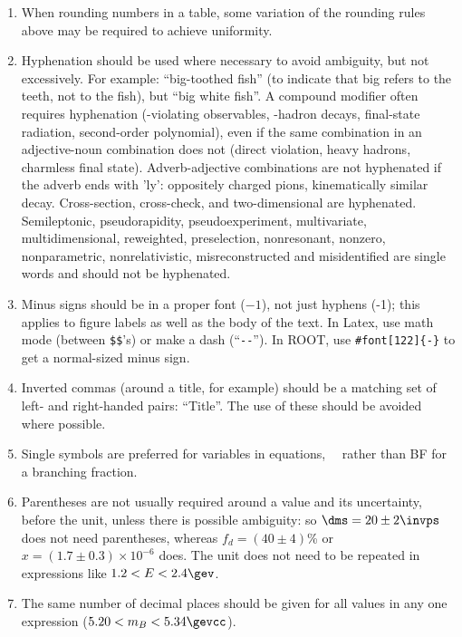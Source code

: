 \begin{enumerate}
\item When rounding numbers in a table, some variation of the rounding
  rules above may be required to achieve uniformity.

\item Hyphenation should be used where necessary to avoid ambiguity,
  but not excessively. For example: ``big-toothed fish''
  (to indicate that big refers to the teeth, not to the fish),
  but ``big white fish''.
  A compound modifier often requires hyphenation 
  (\CP-violating observables, \bquark-hadron decays, final-state radiation, second-order polynomial),
  even if the same combination in an adjective-noun combination does not
  (direct \CP violation, heavy \bquark hadrons, charmless final state).
  Adverb-adjective combinations are not hyphenated if the adverb ends with 'ly':
  oppositely charged pions, kinematically similar decay.
  Cross-section, cross-check, and two-dimensional are hyphenated.
  Semileptonic, pseudorapidity, pseudoexperiment, multivariate, multidimensional, reweighted, preselection, 
  nonresonant, nonzero, nonparametric, nonrelativistic, misreconstructed and misidentified
  are single words and should not be hyphenated.

\item Minus signs should be in a proper font ($-1$), not just hyphens
  (-1); this applies to figure labels as well as the body of the text.
  In Latex, use math mode (between \verb!$$!'s) or make a dash (``\verb!--!'').
  In ROOT, use \verb!#font[122]{-}! to get a normal-sized minus sign. 

\item Inverted commas (around a title, for example) should be a
  matching set of left- and right-handed pairs: ``Title''. The use of
  these should be avoided where possible.

\item Single symbols are preferred for variables in equations, \eg\
  \BF\ rather than BF for a branching fraction.

\item Parentheses are not usually required around a value and its
  uncertainty, before the unit, unless there is possible ambiguity: so
  $\dms = 20 \pm 2\invps$ does not need parentheses, whereas $f_d =
  (40 \pm 4)$\% or $x=(1.7\pm0.3)\times 10^{-6}$ does.
  The unit does not need to be repeated in
  expressions like $1.2 < E < 2.4\gev$.

\item The same number of decimal places should be given for all values
  in any one expression (\eg $5.20 < m_B < 5.34\gevcc$).


\end{enumerate}
